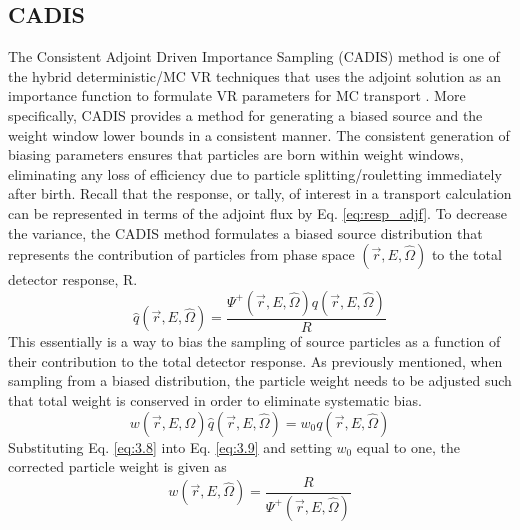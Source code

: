 \subsection{CADIS}
The Consistent Adjoint Driven Importance Sampling (CADIS) method is one of the
hybrid deterministic/MC VR
techniques that uses the adjoint solution as an importance function to 
formulate VR parameters for MC transport \cite{cadis}.
More specifically, CADIS provides a method for generating
a biased source and the weight window lower bounds in a consistent manner.
The consistent generation of biasing parameters
ensures that particles are born within weight windows, eliminating any loss
of efficiency due to particle splitting/rouletting immediately after birth.
Recall that the response, or tally, of interest in a transport calculation can be 
represented in terms of the adjoint flux by Eq. \ref{eq:resp_adjf}.
To decrease the variance, the CADIS method formulates a biased
source distribution that represents the contribution of particles from phase space
$(\overrightarrow{r}, E, \widehat{\Omega})$ 
to the total detector response, R.
\begin{equation} \label{eq:3.8}
	\widehat{q}(\overrightarrow{r}, E, \widehat{\Omega}) =
	\frac{\Psi^{+}(\overrightarrow{r}, E,\widehat{\Omega})
	q(\overrightarrow{r}, E, \widehat{\Omega})}{R}
\end{equation}
This essentially is a way to bias the sampling of source particles as a function of their 
contribution to the total detector response.
As previously mentioned, when sampling from a biased distribution, the particle weight
needs to be adjusted such that total weight is conserved in order to eliminate systematic bias.  
\begin{equation} \label{eq:3.9}
	w(\overrightarrow{r}, E,
	\widehat{\Omega})\widehat{q}(\overrightarrow{r}, E, \widehat{\Omega})=
	w_{0}q(\overrightarrow{r}, E, \widehat{\Omega})
\end{equation}
Substituting Eq. \ref{eq:3.8} into Eq. \ref{eq:3.9} and setting $w_0$ equal to one, the corrected 
particle weight is given as
\begin{equation} \label{eq:3.10}
	w(\overrightarrow{r}, E, \widehat{\Omega})=
	\frac{R}{\Psi^{+}(\overrightarrow{r}, E, \widehat{\Omega})}
\end{equation}


